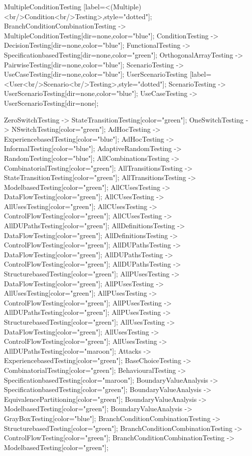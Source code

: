\documentclass{article}
\begin{document}
{MultipleConditionTesting [label=<(Multiple)<br/>Condition<br/>Testing>,style="dotted"];
BranchConditionCombinationTesting -> MultipleConditionTesting[dir=none,color="blue"];
ConditionTesting -> DecisionTesting[dir=none,color="blue"];
FunctionalTesting -> SpecificationbasedTesting[dir=none,color="green"];
OrthogonalArrayTesting -> PairwiseTesting[dir=none,color="blue"];
ScenarioTesting -> UseCaseTesting[dir=none,color="blue"];
UserScenarioTesting [label=<User<br/>Scenario<br/>Testing>,style="dotted"];
ScenarioTesting -> UserScenarioTesting[dir=none,color="blue"];
UseCaseTesting -> UserScenarioTesting[dir=none];

ZeroSwitchTesting -> StateTransitionTesting[color="green"];
OneSwitchTesting -> NSwitchTesting[color="green"];
AdHocTesting -> ExperiencebasedTesting[color="blue"];
AdHocTesting -> InformalTesting[color="blue"];
AdaptiveRandomTesting -> RandomTesting[color="blue"];
AllCombinationsTesting -> CombinatorialTesting[color="green"];
AllTransitionsTesting -> StateTransitionTesting[color="green"];
AllTransitionsTesting -> ModelbasedTesting[color="green"];
AllCUsesTesting -> DataFlowTesting[color="green"];
AllCUsesTesting -> AllUsesTesting[color="green"];
AllCUsesTesting -> ControlFlowTesting[color="green"];
AllCUsesTesting -> AllDUPathsTesting[color="green"];
AllDefinitionsTesting -> DataFlowTesting[color="green"];
AllDefinitionsTesting -> ControlFlowTesting[color="green"];
AllDUPathsTesting -> DataFlowTesting[color="green"];
AllDUPathsTesting -> ControlFlowTesting[color="green"];
AllDUPathsTesting -> StructurebasedTesting[color="green"];
AllPUsesTesting -> DataFlowTesting[color="green"];
AllPUsesTesting -> AllUsesTesting[color="green"];
AllPUsesTesting -> ControlFlowTesting[color="green"];
AllPUsesTesting -> AllDUPathsTesting[color="green"];
AllPUsesTesting -> StructurebasedTesting[color="green"];
AllUsesTesting -> DataFlowTesting[color="green"];
AllUsesTesting -> ControlFlowTesting[color="green"];
AllUsesTesting -> AllDUPathsTesting[color="maroon"];
Attacks -> ExperiencebasedTesting[color="green"];
BaseChoiceTesting -> CombinatorialTesting[color="green"];
BehaviouralTesting -> SpecificationbasedTesting[color="maroon"];
BoundaryValueAnalysis -> SpecificationbasedTesting[color="green"];
BoundaryValueAnalysis -> EquivalencePartitioning[color="green"];
BoundaryValueAnalysis -> ModelbasedTesting[color="green"];
BoundaryValueAnalysis -> GrayBoxTesting[color="blue"];
BranchConditionCombinationTesting -> StructurebasedTesting[color="green"];
BranchConditionCombinationTesting -> ControlFlowTesting[color="green"];
BranchConditionCombinationTesting -> ModelbasedTesting[color="green"];
}
\end{document}
